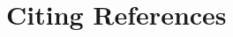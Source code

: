 \documentclass[output=paper,colorlinks,citecolor=brown]{langscibook}
\begin{document}



\section{Citing References}
\end{document}
